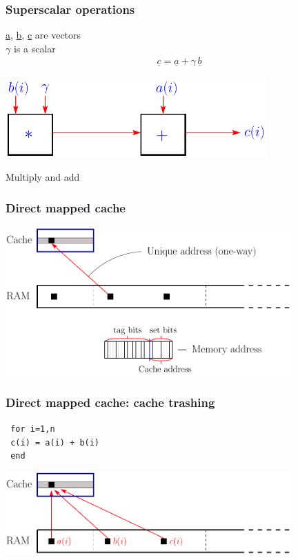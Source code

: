 \documentclass{beamer}
\begin{document}
\begin{frame}\frametitle{Superscalar operations}
\underline{a}, \underline{b}, \underline{c} are vectors\\
$\gamma$ is a scalar
\begin{align*}
 \underline{c} = \underline{a} + \gamma\, \underline{b} 
 \end{align*}
 \vspace{0.5cm}

\begin{center}
  \includegraphics[width=10cm]{../../notes/01.single/SuperScalar}
\end{center}
 \vspace{0.5cm}

\begin{center}
  Multiply and add
\end{center}
\end{frame}

\begin{frame}\frametitle{Direct mapped cache}
\begin{center}
  \includegraphics[width=11cm]{../../notes/01.single/DirectMappedCache}
\end{center}
\end{frame}

\begin{frame}\frametitle{Direct mapped cache: cache trashing}
\vspace{.5cm}
\hspace{3cm}\texttt{   for i=1,n}           \\
\hspace{4cm}\texttt{          c(i) = a(i) + b(i)}\\
\hspace{3cm}\texttt{   end}

\begin{center}
  \includegraphics[width=11cm]{../../notes/01.single/CacheTrashing}
\end{center}
\end{frame}
\end{document}
